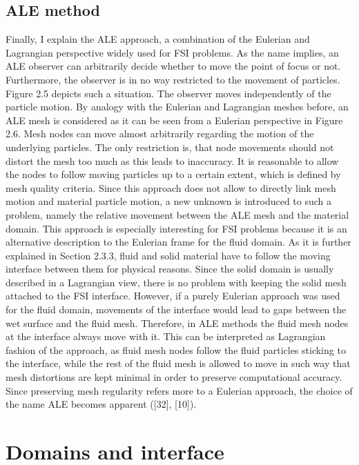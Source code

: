 \subsection{ALE method}
\label{subsec:ALE}

Finally, I explain the ALE approach, a combination of the Eulerian and Lagrangian perspective widely
used for FSI problems. As the name implies, an ALE observer can arbitrarily decide whether to move
the point of focus or not. Furthermore, the observer is in no way restricted to the movement of particles.
Figure 2.5 depicts such a situation. The observer moves independently of the particle motion.
By analogy with the Eulerian and Lagrangian meshes before, an ALE mesh is considered as it can be seen
from a Eulerian perspective in Figure 2.6. Mesh nodes can move almost arbitrarily regarding the motion
of the underlying particles. The only restriction is, that node movements should not distort the mesh too
much as this leads to inaccuracy. It is reasonable to allow the nodes to follow moving particles up to a
certain extent, which is defined by mesh quality criteria. Since this approach does not allow to directly link mesh motion and material particle motion, a new unknown is introduced to such a problem, namely
the relative movement between the ALE mesh and the material domain. This approach is especially
interesting for FSI problems because it is an alternative description to the Eulerian frame for the fluid
domain. As it is further explained in Section 2.3.3, fluid and solid material have to follow the moving
interface between them for physical reasons. Since the solid domain is usually described in a Lagrangian
view, there is no problem with keeping the solid mesh attached to the FSI interface. However, if a purely
Eulerian approach was used for the fluid domain, movements of the interface would lead to gaps between
the wet surface and the fluid mesh. Therefore, in ALE methods the fluid mesh nodes at the interface
always move with it. This can be interpreted as Lagrangian fashion of the approach, as fluid mesh nodes
follow the fluid particles sticking to the interface, while the rest of the fluid mesh is allowed to move
in such way that mesh distortions are kept minimal in order to preserve computational accuracy. Since
preserving mesh regularity refers more to a Eulerian approach, the choice of the name ALE becomes
apparent ([32], [10]).


\section{Domains and interface}
\label{sec:models}

